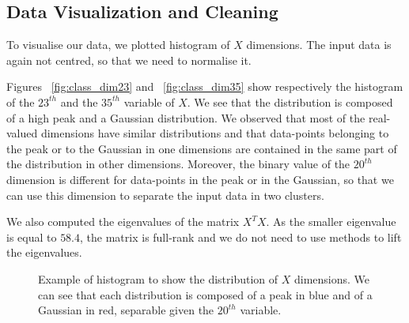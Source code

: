 \documentclass{article} %
\begin{document}
\subsection{Data Visualization and Cleaning}
To visualise our data, we plotted histogram of $X$ dimensions. The input data is again not centred, so that we need to normalise it.

Figures ~\ref{fig:class_dim23} and ~\ref{fig:class_dim35} show respectively the histogram of the $23^{th}$ and the $35^{th}$ variable of $X$. We see that the distribution is composed of a high peak and a Gaussian distribution. We observed that most of the real-valued dimensions have similar distributions and that data-points belonging to the peak or to the Gaussian in one dimensions are contained in the same part of the distribution in other dimensions. Moreover, the binary value of the $20^{th}$ dimension is different for data-points in the peak or in the Gaussian, so that we can use this dimension to separate the input data in two clusters.

We also computed the eigenvalues of the matrix $X^{T}X$. As the smaller eigenvalue is equal to $58.4$, the matrix is full-rank and we do not need to use methods to lift the eigenvalues.

\begin{figure}[!h] %
	\center
	\hfill
	\caption{Example of histogram to show the distribution of $X$ dimensions. We can see that each distribution is composed of a peak in blue and of a Gaussian in red, separable given the $20^{th}$ variable.}
\end{figure}
\end{document}
